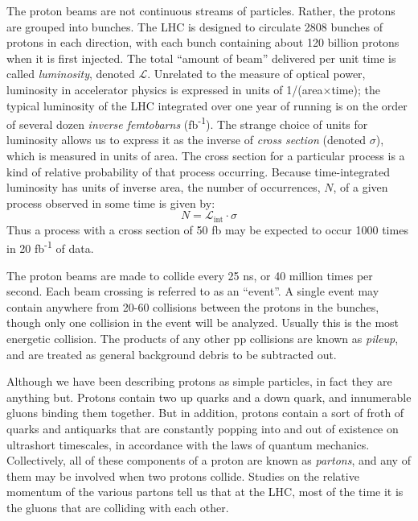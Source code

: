 The proton beams are not continuous streams of particles. Rather, the
protons are grouped into bunches. The LHC is designed to circulate
2808 bunches of protons in each direction, with each bunch containing
about 120 billion protons when it is first injected.
The total ``amount of beam'' delivered per unit time is called
\emph{luminosity}, denoted $\mathcal{L}$. Unrelated to the measure of
optical power, luminosity in accelerator physics is expressed in
units of 1/(area$\times$time); the typical luminosity of the LHC integrated over one
year of running is on the order of several dozen
\emph{inverse femtobarns} (fb\textsuperscript{-1}). The strange
choice of units for luminosity allows us to express it as the inverse of
\emph{cross section} (denoted $\sigma$), which is measured in units
of area. The cross section for a particular process is a kind of
relative probability of that process occurring. Because time-integrated
luminosity has units of inverse area, the number of occurrences, $N$,
of a given process observed in some time is given by:
\begin{equation}
N = \mathcal{L}_\text{int} \cdot \sigma
\end{equation}
Thus a process with a cross section of 50 fb may be expected
to occur 1000 times in 20 fb\textsuperscript{-1} of data.

The proton beams are made to collide every 25 ns, or 40 million times
per second. Each beam crossing is referred to as an ``event''. A
single event may contain anywhere from 20-60 collisions between the
protons in the bunches, though only one collision in the event will be
analyzed. Usually this is the most energetic collision. The products
of any other pp collisions are known as \emph{pileup}, and are
treated as general background debris to be subtracted out.

Although we have been describing protons as simple particles, in fact
they are anything but. Protons contain two up quarks and a down quark,
and innumerable gluons binding them together. But in addition, protons
contain a sort of froth of quarks and antiquarks that are constantly
popping into and out of existence on ultrashort timescales, in
accordance with the laws of quantum mechanics. Collectively, all of
these components of a proton are known as \emph{partons}, and any of
them may be involved when two protons collide. Studies on the relative
momentum of the various partons tell us that at the LHC, most of the
time it is the gluons that are colliding with each other. %

